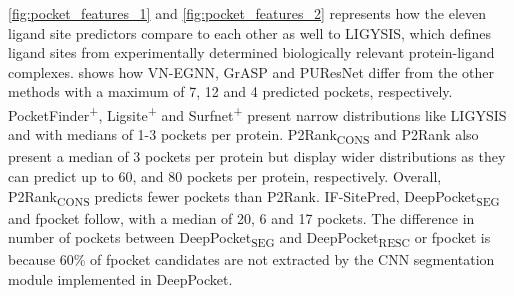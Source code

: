 \autoref{fig:pocket_features_1} and \autoref{fig:pocket_features_2} represents how the eleven ligand site predictors compare to each other as well to LIGYSIS, which defines ligand sites from experimentally determined biologically relevant protein-ligand complexes.  shows how VN-EGNN, GrASP and PUResNet differ from the other methods with a maximum of 7, 12 and 4 predicted pockets, respectively. PocketFinder\textsuperscript{+}, Ligsite\textsuperscript{+} and Surfnet\textsuperscript{+} present narrow distributions like LIGYSIS and with medians of 1-3 pockets per protein. P2Rank\textsubscript{CONS} and P2Rank also present a median of 3 pockets per protein but display wider distributions as they can predict up to 60, and 80 pockets per protein, respectively. Overall, P2Rank\textsubscript{CONS} predicts fewer pockets than P2Rank. IF-SitePred, DeepPocket\textsubscript{SEG} and fpocket follow, with a median of 20, 6 and 17 pockets. The difference in number of pockets between DeepPocket\textsubscript{SEG} and DeepPocket\textsubscript{RESC} or fpocket is because 60\% of fpocket candidates are not extracted by the CNN segmentation module implemented in DeepPocket.


